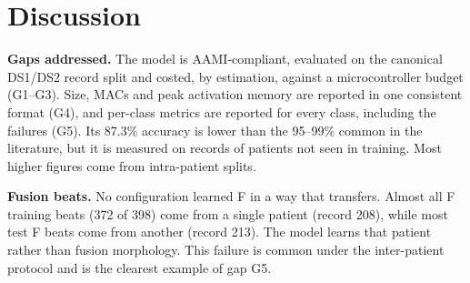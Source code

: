 \documentclass[conference]{IEEEtran}
\begin{document}
\begin{table}[t]
\caption{Comparison with Published Work}
\label{tab:compare}
\centering
\footnotesize
\setlength{\tabcolsep}{2.2pt}
\end{table}

\section{Discussion}
\label{sec:discussion}
\textbf{Gaps addressed.} The model is AAMI-compliant, evaluated on the canonical DS1/DS2 record split and costed, by estimation, against a microcontroller budget (G1--G3). Size, MACs and peak activation memory are reported in one consistent format (G4), and per-class metrics are reported for every class, including the failures (G5). Its 87.3\% accuracy is lower than the 95--99\% common in the literature, but it is measured on records of patients not seen in training. Most higher figures come from intra-patient splits.

\textbf{Fusion beats.} No configuration learned F in a way that transfers. Almost all F training beats (372 of 398) come from a single patient (record 208), while most test F beats come from another (record 213). The model learns that patient rather than fusion morphology. This failure is common under the inter-patient protocol and is the clearest example of gap G5.
\end{document}
